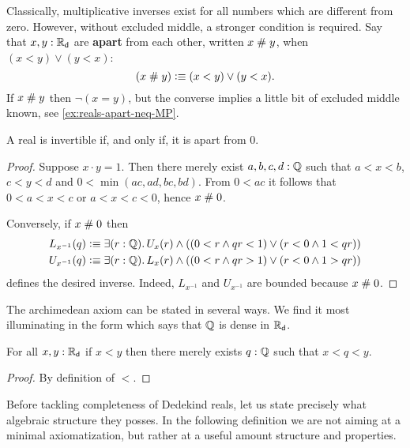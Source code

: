 Classically, multiplicative inverses exist for all numbers which are different from zero.
However, without excluded middle, a stronger condition is required. Say that $x, y : \mathbb{R}_\mathsf{d}$
are \textbf{apart} from each other, written $x \mathrel{\#} y$, when $(x < y) \lor (y < x)$:
%
\begin{equation*}
  (x \mathrel{\#} y) \vcentcolon\equiv (x < y) \lor (y < x).
\end{equation*}
%
If $x \mathrel{\#} y$ then $\lnot (x = y)$, but the converse implies a little bit of excluded
middle known, see \autoref{ex:reals-apart-neq-MP}.

\begin{thm} \label{RD-inverse-apart-0}
  A real is invertible if, and only if, it is apart from $0$.
\end{thm}

\begin{proof}
  Suppose $x \cdot y = 1$. Then there merely exist $a, b, c, d : \mathbb{Q}$ such that
  $a < x < b$, $c < y < d$ and $0 < \min (a c, a d, b c, b d)$. From $0 < a c$ it follows
  that $0 < a < x < c$ or $a < x < c < 0$, hence $x \mathrel{\#} 0$.

  Conversely, if $x \mathrel{\#} 0$ then
  \begin{align*}
    L_{x^{-1}}(q) &\defeq
    \exis{r : \Q} U_x(r) \land ((0 < r \land q r < 1) \lor (r < 0 \land 1 < q r))
    \\
    U_{x^{-1}}(q) &\defeq
    \exis{r : \Q} L_x(r) \land ((0 < r \land q r > 1) \lor (r < 0 \land 1 > q r))
  \end{align*}
  defines the desired inverse. Indeed, $L_{x^{-1}}$ and $U_{x^{-1}}$ are bounded because
  $x \mathrel{\#} 0$.
\end{proof}

The archimedean axiom can be stated in several ways. We find it most illuminating in the
form which says that $\mathbb{Q}$ is dense in $\mathbb{R}_\mathsf{d}$.

\begin{thm} \label{RD-archimedean}
  For all $x, y : \mathbb{R}_\mathsf{d}$ if $x < y$ then there merely exists $q : \mathbb{Q}$ such that
  $x < q < y$.
\end{thm}

\begin{proof}
  By definition of $<$.
\end{proof}

Before tackling completeness of Dedekind reals, let us state precisely what algebraic
structure they posses. In the following definition we are not aiming at a minimal
axiomatization, but rather at a useful amount structure and properties.

